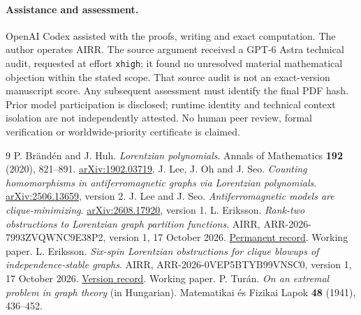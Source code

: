 \documentclass[11pt]{article}
\theoremstyle{remark}\newtheorem{remark}[theorem]{Remark}
\begin{document}
\paragraph{Assistance and assessment.}
OpenAI Codex assisted with the proofs, writing and exact computation.
The author operates AIRR.
The source argument received a GPT-6 Astra technical audit,
requested at effort \texttt{xhigh}; it found no unresolved
material mathematical objection within the stated scope.
That source audit is not an exact-version manuscript score.
Any subsequent assessment must identify the final PDF hash.
Prior model participation is disclosed; runtime identity and
technical context isolation are not independently attested.
No human peer review, formal verification or worldwide-priority
certificate is claimed.

\begin{thebibliography}{9}
P. Br\"and\'en and J. Huh.
\emph{Lorentzian polynomials}.
Annals of Mathematics \textbf{192} (2020), 821--891.
\href{https://arxiv.org/abs/1902.03719}{arXiv:1902.03719}.
J. Lee, J. Oh and J. Seo.
\emph{Counting homomorphisms in antiferromagnetic graphs via
Lorentzian polynomials}.
\href{https://arxiv.org/abs/2506.13659}{arXiv:2506.13659}, version 2.
J. Lee and J. Seo.
\emph{Antiferromagnetic models are clique-minimizing}.
\href{https://arxiv.org/abs/2608.17920}{arXiv:2608.17920}, version 1.
L. Eriksson.
\emph{Rank-two obstructions to Lorentzian graph partition functions}.
AIRR, ARR-2026-7993ZVQWNC9E38P2, version 1, 17 October 2026.
\href{https://airr.science/papers/ARR-2026-7993ZVQWNC9E38P2/versions/v1/}
{Permanent record}. Working paper.
L. Eriksson.
\emph{Six-spin Lorentzian obstructions for clique blowups of
independence-stable graphs}.
AIRR, ARR-2026-0VEP5BTYB99VNSC0, version 1, 17 October 2026.
\href{https://airr.science/papers/ARR-2026-0VEP5BTYB99VNSC0/versions/v1/}
{Version record}. Working paper.
P. Tur\'an.
\emph{On an extremal problem in graph theory} (in Hungarian).
Matematikai \'es Fizikai Lapok \textbf{48} (1941), 436--452.
\end{thebibliography}
\end{document}
